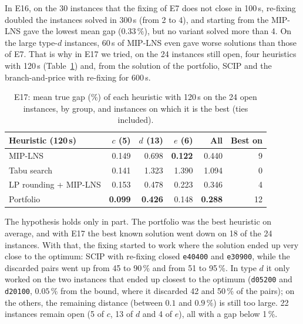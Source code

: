 \documentclass[11pt,a4paper]{article}
\newcommand{\code}[1]{\texttt{#1}}
\begin{document}
In E16, on the 30 instances that the fixing of E7 does not close in 100\,s, re-fixing doubled the
instances solved in 300\,s (from 2 to 4), and starting from the MIP-LNS gave the lowest mean gap
($0.33\,\%$), but no variant solved more than 4. On the large type-$d$ instances, 60\,s of MIP-LNS
even gave worse solutions than those of E7. That is why in E17 we tried, on the 24 instances still
open, four heuristics with 120\,s (Table~\ref{tab:open}) and, from the solution of the portfolio,
SCIP and the branch-and-price with re-fixing for 600\,s.

\begin{table}[ht]
\centering
\caption{E17: mean true gap (\%) of each heuristic with 120\,s on the 24 open instances, by group,
and instances on which it is the best (ties included).}
\label{tab:open}
\small
\begin{tabular}{l r r r r r}
\toprule
Heuristic (120\,s) & $c$ (5) & $d$ (13) & $e$ (6) & All & Best on \\
\midrule
MIP-LNS                         & 0.149 & 0.698 & \textbf{0.122} & 0.440 & 9 \\
Tabu search                     & 0.141 & 1.323 & 1.390 & 1.094 & 0 \\
LP rounding + MIP-LNS           & 0.153 & 0.478 & 0.223 & 0.346 & 4 \\
Portfolio                       & \textbf{0.099} & \textbf{0.426} & 0.148 & \textbf{0.288} & 12 \\
\bottomrule
\end{tabular}
\end{table}

The hypothesis holds only in part. The portfolio was the best heuristic on average, and with E17
the best known solution went down on 18 of the 24 instances. With that, the fixing started to work
where the solution ended up very close to the optimum: SCIP with re-fixing closed \code{e40400} and
\code{e30900}, while the discarded pairs went up from 45 to 90\,\% and from 51 to 95\,\%. In type
$d$ it only worked on the two instances that ended up closest to the optimum (\code{d05200} and
\code{d20100}, $0.05\,\%$ from the bound, where it discarded 42 and 50\,\% of the pairs); on the
others, the remaining distance (between $0.1$ and $0.9\,\%$) is still too large. 22 instances remain
open (5 of $c$, 13 of $d$ and 4 of $e$), all with a gap below 1\,\%.

\end{document}
